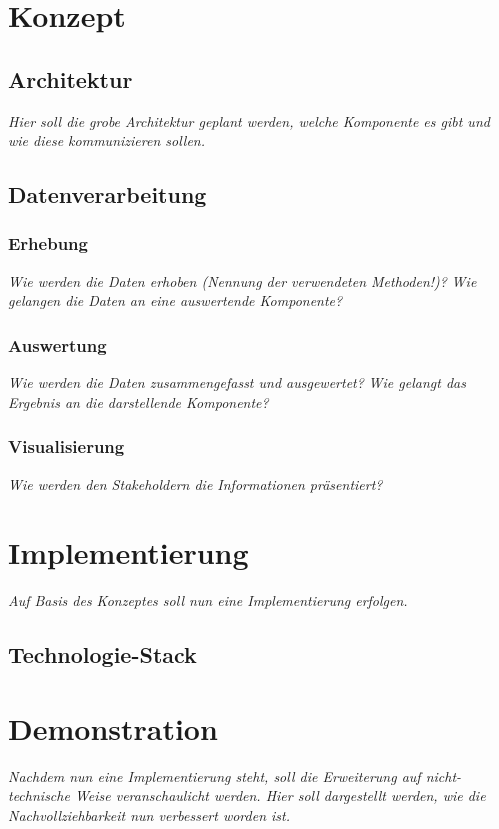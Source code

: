 	
\section{Konzept}
	
	\subsection{Architektur}

	\textit{Hier soll die grobe Architektur geplant werden, welche Komponente es gibt und wie diese kommunizieren sollen.}
	
	\subsection{Datenverarbeitung}
		
		\subsubsection{Erhebung}
		\textit{Wie werden die Daten erhoben (Nennung der verwendeten Methoden!)?}
		\textit{Wie gelangen die Daten an eine auswertende Komponente?}
		
		\subsubsection{Auswertung}
		\textit{Wie werden die Daten zusammengefasst und ausgewertet?}
		\textit{Wie gelangt das Ergebnis an die darstellende Komponente?}
		
		\subsubsection{Visualisierung}
		\textit{Wie werden den Stakeholdern die Informationen präsentiert?}

\section{Implementierung}

	\textit{Auf Basis des Konzeptes soll nun eine Implementierung erfolgen.}

	\subsection{Technologie-Stack}

\section{Demonstration}

	\textit{Nachdem nun eine Implementierung steht, soll die Erweiterung auf nicht-technische Weise veranschaulicht werden. Hier soll dargestellt werden, wie die Nachvollziehbarkeit nun verbessert worden ist.}